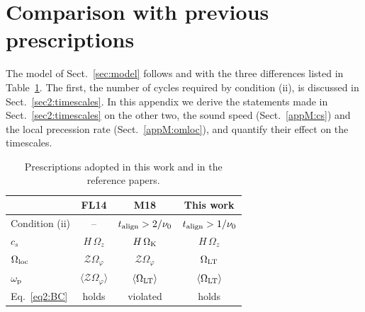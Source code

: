 \section{Comparison with previous prescriptions}
\label{app:choices}

The model of Sect.~\ref{sec:model} follows \citet{Motta2017} and \citet{FoucartLai2014} with the three differences listed in Table~\ref{tab:choices}.
The first, the number of cycles required by condition (ii), is discussed in Sect.~\ref{sec2:timescales}.
In this appendix we derive the statements made in Sect.~\ref{sec2:timescales} on the other two, the sound speed (Sect.~\ref{appM:cs}) and the local precession rate (Sect.~\ref{appM:omloc}), and quantify their effect on the timescales.

\begin{table}
\caption{Prescriptions adopted in this work and in the reference papers.}
\label{tab:choices}
\centering
\begin{tabular}{lccc}
\hline\hline
 & FL14 & M18 & This work \\
\hline
Condition (ii)          & --                          & $t_\textup{align}>2/\nu_0$   & $t_\textup{align}>1/\nu_0$ \\
$c_s$                   & $H\,\Omega_z$               & $H\,\Omega_\textup{K}$       & $H\,\Omega_z$ \\
$\Omega_\textup{loc}$   & $\mathcal{Z}\Omega_\varphi$ & $\mathcal{Z}\Omega_\varphi$  & $\Omega_\textup{LT}$ \\
$\omega_\textup{p}$     & $\langle\mathcal{Z}\Omega_\varphi\rangle$ & $\langle\Omega_\textup{LT}\rangle$ & $\langle\Omega_\textup{LT}\rangle$ \\
Eq.~\eqref{eq2:BC}      & holds                       & violated                     & holds \\
\hline
\end{tabular}
\end{table}


